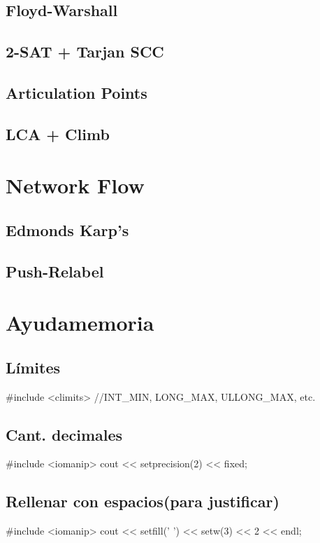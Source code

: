 \subsection{Floyd-Warshall}
\subsection{2-SAT + Tarjan SCC}
\subsection{Articulation Points}
\subsection{LCA + Climb}
\section{Network Flow}
\subsection{Edmonds Karp’s}
\subsection{Push-Relabel}


\section{Ayudamemoria}%
\subsection*{Límites}
\begin{code}
#include <climits> //INT_MIN, LONG_MAX, ULLONG_MAX, etc.
\end{code}
\subsection*{Cant. decimales}
\begin{code}
#include <iomanip>
cout << setprecision(2) << fixed;
\end{code}
\subsection*{Rellenar con espacios(para justificar)}
\begin{code}
#include <iomanip>
cout << setfill(' ') << setw(3) << 2 << endl;
\end{code}
